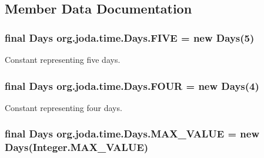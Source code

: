 \subsection{Member Data Documentation}
\hypertarget{classorg_1_1joda_1_1time_1_1_days_a8bb594be5513ec6ae35efa0cee35c5ca}{
\subsubsection[{F\-I\-V\-E}]{\setlength{\rightskip}{0pt plus 5cm}final {\bf Days} org.\-joda.\-time.\-Days.\-F\-I\-V\-E = new {\bf Days}(5)\hspace{0.3cm}{\ttfamily [static]}}}\label{classorg_1_1joda_1_1time_1_1_days_a8bb594be5513ec6ae35efa0cee35c5ca}
Constant representing five days. \hypertarget{classorg_1_1joda_1_1time_1_1_days_ad3ed74196b15442dfa553a18dbcf7c73}{
\subsubsection[{F\-O\-U\-R}]{\setlength{\rightskip}{0pt plus 5cm}final {\bf Days} org.\-joda.\-time.\-Days.\-F\-O\-U\-R = new {\bf Days}(4)\hspace{0.3cm}{\ttfamily [static]}}}\label{classorg_1_1joda_1_1time_1_1_days_ad3ed74196b15442dfa553a18dbcf7c73}
Constant representing four days. \hypertarget{classorg_1_1joda_1_1time_1_1_days_ac6c1d4741e6e3b4d8a188833321f7f8d}{
\subsubsection[{M\-A\-X\-\_\-\-V\-A\-L\-U\-E}]{\setlength{\rightskip}{0pt plus 5cm}final {\bf Days} org.\-joda.\-time.\-Days.\-M\-A\-X\-\_\-\-V\-A\-L\-U\-E = new {\bf Days}(Integer.\-M\-A\-X\-\_\-\-V\-A\-L\-U\-E)\hspace{0.3cm}{\ttfamily [static]}}}\label{classorg_1_1joda_1_1time_1_1_days_ac6c1d4741e6e3b4d8a188833321f7f8d}
